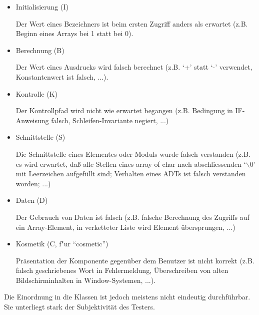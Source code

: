 \begin{itemize}

\item Initialisierung (I)

Der Wert eines Bezeichners ist beim ersten
Zugriff anders als erwartet (z.B.  Beginn eines Arrays bei 1 statt bei
0).

\item Berechnung (B)

Der Wert eines Ausdrucks wird falsch berechnet
(z.B. `+' statt `-' verwendet, Konstantenwert ist falsch, ...).

\item Kontrolle (K)

Der Kontrollpfad wird nicht wie erwartet begangen
(z.B. Bedingung in IF- Anweisung falsch, Schleifen-Invariante negiert,
...)

\item Schnittstelle (S)

Die Schnittstelle eines Elementes oder Moduls wurde
falsch verstanden (z.B. es wird erwartet, da{\ss} alle Stellen eines
array of char nach abschliessenden `$\backslash$0' mit Leerzeichen aufgef\"ullt
sind; Verhalten eines ADTs ist falsch verstanden worden; ...)

\item Daten (D)

Der Gebrauch von Daten ist falsch (z.B. falsche Berechnung
des Zugriffs auf ein Array-Element, in verketteter Liste wird Element
\"ubersprungen, ...)

\item Kosmetik (C, f"ur "`cosmetic"')

Pr\"asentation der Komponente gegen\"uber dem Benutzer
ist nicht korrekt (z.B.  falsch geschriebenes Wort in Fehlermeldung,
\"Uberschreiben von alten Bildschirminhalten in Window-Systemen, ...).

\end{itemize}

Die Einordnung in die Klassen ist jedoch meistens nicht eindeutig
durchf\"uhrbar. Sie unterliegt stark der Subjektivit\"at des
Testers.  
